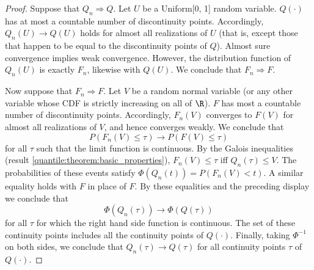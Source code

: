  
 \begin{proof}
  Suppose that $Q_n\Rightarrow Q$. 
  Let $U$ be a Uniform[0, 1] random variable. 
  $Q(\cdot)$ has at most a countable number of discontinuity points.
  Accordingly, $Q_n(U)\to Q(U)$ holds for almost all realizations of $U$ (that is, except those that happen to be equal to the discontinuity points of $Q$).
  Almost sure convergence implies weak convergence.
  However, the distribution function of $Q_n(U)$ is exactly $F_n$, likewise with $Q(U)$.
  We conclude that $F_n\Rightarrow F$. 
  
  
  \vspace{3mm}
  
  Now suppose that $F_n\Rightarrow F$. 
   Let $V$ be a random normal variable (or any other variable whose CDF is strictly increasing on all of $\R$).
   $F$ has most a countable number of discontinuity points.
   Accordingly, $F_n(V)$ converges to $F(V)$ for almost all realizations of $V$, and hence converges weakly.
   We conclude that 
   \begin{equation}
   	P(F_n(V)\leq \tau) \to P(F(V)\leq \tau)
   \end{equation} 
   for all $\tau$ such that the limit function is continuous. 
   By the Galois inequalities (result \ref{quantile:theorem:basic_properties}), $F_n(V)\leq \tau$ iff $Q_n(\tau)\leq V$. The probabilities of these events satisfy $\Phi(Q_n(t)) = P(F_n(V)<t)$. A similar equality holds with $F$ in place of $F$.
   By these equalities and the preceding display we conclude that 
   \begin{equation}
   	 \Phi(Q_n(\tau)) \to \Phi(Q(\tau))
   \end{equation}
   for all $\tau$ for which the right hand side function is continuous. 
   The set of these continuity points includes all the continuity points of $Q(\cdot)$.
   Finally, taking $\Phi^{-1}$ on both sides, we conclude that $Q_n(\tau)\to Q(\tau)$ for all continuity points $\tau$ of $Q(\cdot)$.
 \end{proof}
 
 
 
  
 
